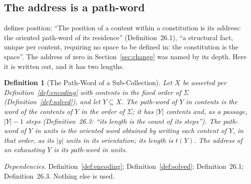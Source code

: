 \documentclass[pdflatex,sn-mathphys-num]{sn-jnl}
\theoremstyle{thmstyleone}%
\theoremstyle{thmstyletwo}%
\theoremstyle{thmstylethree}%
\newtheorem{definition}{Definition}[section]
\newtheorem{definition}{Definition}[section]
\newcommand{\PA}{\cite{Swanagon2026PA}}
\newcommand{\q}[1]{``#1''}        %
\newcommand{\deps}[1]{\par\begin{sloppypar}\noindent\emph{Dependencies.} #1 Nothing else is used.\end{sloppypar}}
\begin{document}
\subsection{The address is a path-word}\label{sec:pathword}
\PA{} defines position: \q{The position of a content within a constitution is its address: the oriented path-word of its residence} (Definition~26.1), \q{a structural fact, unique per content, requiring no space to be defined in: the constitution is the space}. The address of zero in Section~\ref{sec:change} was named by its depth. Here it is written out, and it has two lengths.

\begin{definition}[The Path-Word of a Sub-Collection]\label{def:pathword}
Let $X$ be asserted per Definition~\ref{def:encoding} with contents in the fixed order of $\Sigma$ (Definition~\ref{def:solved}), and let $Y\subseteq X$. The \emph{path-word of $Y$ in contents} is the word of the contents of $Y$ in the order of $\Sigma$; it has $|Y|$ contents and, as a passage, $|Y|-1$ steps (Definition~26.3: \q{its length is the count of its steps}). The \emph{path-word of $Y$ in units} is the oriented word obtained by writing each content of $Y$, in that order, as its $|y|$ units in its orientation; its length is $t(Y)$. The \emph{address} of an exhausting $Y$ is its path-word in units.
\end{definition}
\deps{Definition~\ref{def:encoding}; Definition~\ref{def:solved}; Definition~26.1; Definition~26.3.}
\end{document}
